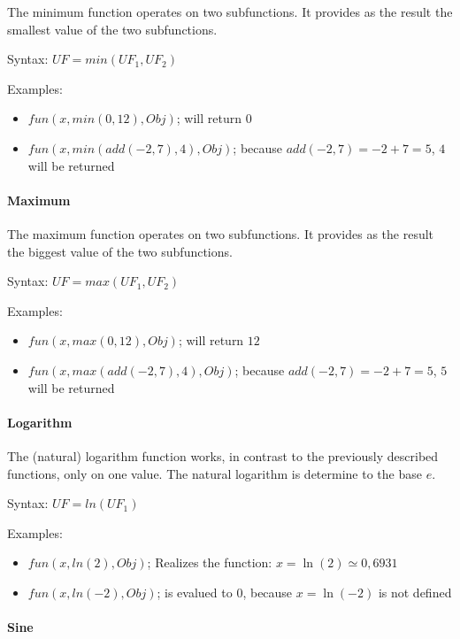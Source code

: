 The minimum function operates on two subfunctions. It provides as the result the smallest value of the two subfunctions.

\bigskip\noindent
Syntax:
$UF=min( UF_1, UF_2 )$

\bigskip\noindent
Examples:
\begin{itemize}
 \item $fun(x, min( 0, 12 ), Obj)$; will return $0$
 \item $fun(x, min( add( -2, 7 ), 4 ), Obj)$; because $add( -2, 7 )= -2+7 = 5$, $4$ will be returned
\end{itemize}


\paragraph{Maximum}

The maximum function operates on two subfunctions. It provides as the result the biggest value of the two subfunctions.

\bigskip\noindent
Syntax:
$UF=max( UF_1, UF_2 )$

\bigskip\noindent
Examples:
\begin{itemize}
 \item $fun(x, max( 0, 12 ), Obj)$; will return $12$
 \item $fun(x, max( add( -2, 7 ), 4 ), Obj)$; because $add( -2, 7 )= -2+7 = 5$, $5$ will be returned
\end{itemize}


\paragraph{Logarithm}

The (natural) logarithm function works, in contrast to the previously described functions, only on one value. The natural logarithm is determine to the base $e$.

\bigskip\noindent
Syntax:
$UF=ln(UF_1)$

\bigskip\noindent
Examples:
\begin{itemize}
 \item $fun(x, ln(2), Obj)$; Realizes the function: $x=\ln{(2)} \simeq 0,6931$
 \item $fun(x, ln(-2), Obj)$; is evalued to $0$, because $x=\ln{(-2)}$ is not defined
\end{itemize}


\paragraph{Sine}

